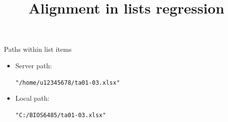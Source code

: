 \documentclass[14pt,t]{beamer}
\title{Alignment in lists regression}
\begin{document}
\begin{frame}{Paths within list items}
\begin{itemize}
\item Server path:
\begin{center}\texttt{"/home/u12345678/ta01-03.xlsx"}\end{center}
\item Local path:
\begin{center}\texttt{"C:/BIOS6485/ta01-03.xlsx"}\end{center}
\end{itemize}
\end{frame}
\end{document}
